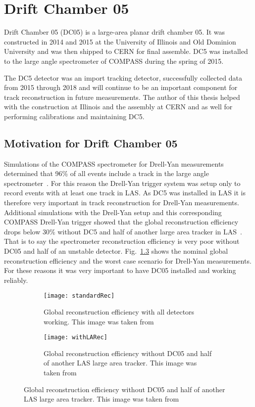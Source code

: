 \chapter{Drift Chamber 05} \label{ch::DC05}
\ifpdf
\graphicspath{{Chapters/DC5/Figs/Raster/}{Chapters/DC5/Figs/PDF/}{Chapters/DC5/Figs/}}
\else \graphicspath{{Chapters/DC5/Figs/Vector/}{Chapters/DC5/Figs/}}
\fi

Drift Chamber 05 (DC05) is a large-area planar drift chamber 05.  It was
constructed in 2014 and 2015 at the University of Illinois and Old Dominion
University and was then shipped to CERN for final assemble.  DC5 was installed
to the large angle spectrometer of COMPASS during the spring of 2015.

The DC5 detector was an import tracking detector, successfully collected data
from 2015 through 2018 and will continue to be an important component for track
reconstruction in future measurements.  The author of this thesis helped with
the construction at Illinois and the assembly at CERN and as well for performing
calibrations and maintaining DC5.

\section{Motivation for Drift Chamber 05}
Simulations of the COMPASS spectrometer for Drell-Yan measurements determined
that 96\% of all events include a track in the large angle
spectrometer~\cite{proposal}.  For this reason the Drell-Yan trigger system was
setup only to record events with at least one track in LAS.  As DC5 was
installed in LAS it is therefore very important in track reconstruction for
Drell-Yan measurements.  Additional simulations with the Drell-Yan setup and
this corresponding COMPASS Drell-Yan trigger showed that the global
reconstruction efficiency drops below 30\% without DC5 and half of another large
area tracker in LAS~\cite{quintans_rec_march12}.  That is to say the
spectrometer reconstruction efficiency is very poor without DC05 and half of an
unstable detector.  Fig.~\ref{fig::specRecEff} shows the nominal global
reconstruction efficiency and the worst case scenario for Drell-Yan
measurements.  For these reasons it was very important to have DC05 installed
and working reliably.

\begin{figure}[h!t]
  \centering
  \begin{subfigure}{.5\textwidth}
    \centering \texttt{[image: standardRec]}
    \caption{Global reconstruction efficiency with all detectors working.  This
      image was taken from~\cite{quintans_rec_march28}}
    \label{fig::standardRec}
  \end{subfigure}%
  \begin{subfigure}{.5\textwidth}
    \centering
    \texttt{[image: withLARec]}
    \caption{Global reconstruction efficiency without DC05 and half of another
      LAS large area tracker.  This image was taken
      from~\cite{quintans_rec_march28}}
    \label{fig::withLARec}
  \end{subfigure}
  \label{fig::specRecEff}
\end{figure}

